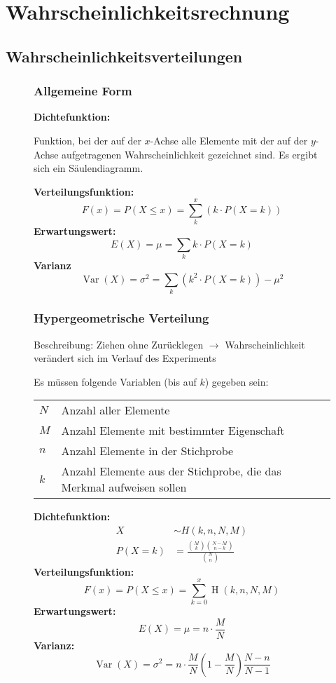 \documentclass[12pt, a4paper, twoside]{scrreprt}
\begin{document}
\section{Wahrscheinlichkeitsrechnung}

\subsection{Wahrscheinlichkeitsverteilungen}

\begin{figure}[H]
  \subsubsection{Allgemeine Form}
  \textbf{Dichtefunktion:}

  Funktion, bei der auf der \(x\)-Achse alle Elemente mit der auf der \(y\)-Achse aufgetragenen Wahrscheinlichkeit gezeichnet sind. Es ergibt sich ein Säulendiagramm.

  \textbf{Verteilungsfunktion:}
  \[F(x) = P(X \leq x) = \sum_k^x(k \cdot P(X=k))\]
  \textbf{Erwartungswert:}
  \[E(X) = \mu = \sum_k k \cdot P(X=k)\]
  \textbf{Varianz}
  \[\operatorname{Var}(X) = \sigma^2 = \sum_k {(k^2 \cdot P(X=k) )} - \mu^2\]
\end{figure}

\begin{figure}[H]
  \subsubsection{Hypergeometrische Verteilung}
Beschreibung: Ziehen ohne Zurücklegen $\rightarrow$ Wahrscheinlichkeit verändert sich im Verlauf des Experiments

  Es müssen folgende Variablen (bis auf \(k\)) gegeben sein:

  \begin{tabular}{ll}
    \toprule
    \(N\) & Anzahl aller Elemente\\
    \(M\) & Anzahl Elemente mit bestimmter Eigenschaft\\
    \(n\) & Anzahl Elemente in der Stichprobe\\
    \(k\) & Anzahl Elemente aus der Stichprobe, die das Merkmal aufweisen sollen\\
    \bottomrule
  \end{tabular}

  \textbf{Dichtefunktion:}
  \begin{align*}
    X &\sim H(k, n, N, M)\\[1em]
    P(X = k) &= \frac{\binom{M}{k}\binom{N-M}{n-k}}{\binom{N}{n}}
  \end{align*}
  \textbf{Verteilungsfunktion:}
  \[F(x) = P(X \leq x) = \sum_{k=0}^x\operatorname{H}(k,n,N,M)\]
  \textbf{Erwartungswert:}
  \[E(X) = \mu = n \cdot \frac{M}{N}\]
  \textbf{Varianz:}
  \[\operatorname{Var}(X) = \sigma^2 = n \cdot \frac{M}{N} \left(1 - \frac{M}{N}\right) \frac{N - n}{N - 1}\]
\end{figure}
\end{document}
